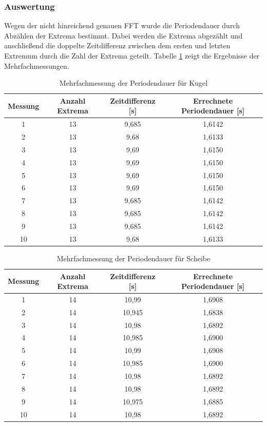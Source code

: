 \documentclass[12pt,a4paper]{article}
\begin{document}
\subsubsection{Auswertung}
Wegen der nicht hinreichend genauen FFT wurde die Periodendauer durch Abzählen der Extrema bestimmt. Dabei werden die Extrema abgezählt und anschließend die doppelte Zeitdifferenz zwischen dem ersten und letzten Extremum durch die Zahl der Extrema geteilt. Tabelle \ref{tab:Kugel_Periodendauern} zeigt die Ergebnisse der Mehrfachmessungen.

\begin{table}
\caption{Mehrfachmessung der Periodendauer für Kugel}
\label{tab:Kugel_Periodendauern}
\begin{center}
\begin{tabular}{|c|c|c|c|}
\hline 
Messung & Anzahl Extrema & Zeitdifferenz [s] & Errechnete Periodendauer [s] \\ 
\hline 
1 & 13 & 9,685 & 1,6142 \\ 
\hline 
2 & 13 & 9,68 & 1,6133 \\ 
\hline 
3 & 13 & 9,69 & 1,6150 \\ 
\hline 
4 & 13 & 9,69 & 1,6150 \\ 
\hline 
5 & 13 & 9,69 & 1,6150 \\ 
\hline 
6 & 13 & 9,69 & 1,6150 \\ 
\hline 
7 & 13 & 9,685 & 1,6142 \\ 
\hline 
8 & 13 & 9,685 & 1,6142 \\ 
\hline 
9 & 13 & 9,685 & 1,6142 \\ 
\hline 
10 & 13 & 9,68 & 1,6133 \\ 
\hline 
\end{tabular} 
\end{center}
\end{table}

\begin{table}
\caption{Mehrfachmessung der Periodendauer für Scheibe}
\label{tab:Scheibe_Periodendauern}
\begin{center}
\begin{tabular}{|c|c|c|c|}
\hline 
Messung & Anzahl Extrema & Zeitdifferenz [s] & Errechnete Periodendauer [s] \\ 
\hline 
1 & 14 & 10,99 & 1,6908 \\ 
\hline 
2 & 14 & 10,945 & 1,6838 \\ 
\hline 
3 & 14 & 10,98 & 1,6892 \\ 
\hline 
4 & 14 & 10,985 & 1,6900 \\ 
\hline 
5 & 14 & 10,99 & 1,6908 \\ 
\hline 
6 & 14 & 10,985 & 1,6900 \\ 
\hline 
7 & 14 & 10,98 & 1,6892 \\ 
\hline 
8 & 14 & 10,98 & 1,6892 \\ 
\hline 
9 & 14 & 10,975 & 1,6885 \\ 
\hline 
10 & 14 & 10,98 & 1,6892 \\ 
\hline 
\end{tabular} 
\end{center}
\end{table}
\end{document}
